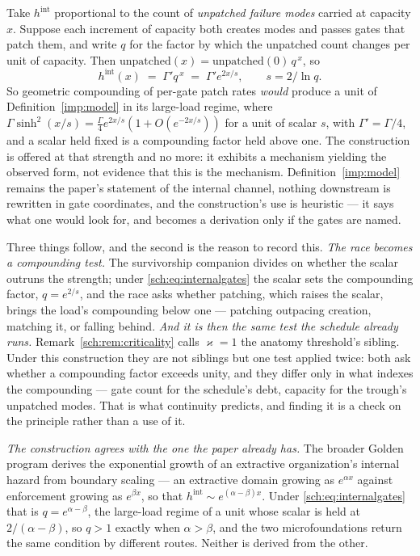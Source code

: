 \begin{remark}\label{sch:rem:internalgates}
Take $h^{\mathrm{int}}$ proportional to the count of \emph{unpatched
failure modes} carried at capacity $x$. Suppose each increment of
capacity both creates modes and passes gates that patch them, and write
$q$ for the factor by which the unpatched count changes per unit of
capacity. Then $\text{unpatched}(x)=\text{unpatched}(0)\,q^{\,x}$, so
\begin{equation}\label{sch:eq:internalgates}
h^{\mathrm{int}}(x)\;=\;\Gamma' q^{\,x}\;=\;\Gamma' e^{2x/s},
\qquad s=2/\ln q .
\end{equation}
So geometric compounding of per-gate patch rates \emph{would} produce a
unit of Definition~\ref{imp:model} in its large-load regime, where
$\Gamma\sinh^2(x/s)=\tfrac{\Gamma}{4}e^{2x/s}(1+O(e^{-2x/s}))$ for a unit of
scalar $s$, with $\Gamma'=\Gamma/4$, and a scalar held fixed is a
compounding factor held above one. The construction is offered at that
strength and no more: it exhibits a mechanism yielding the observed form,
not evidence that this is the mechanism. Definition~\ref{imp:model}
remains the paper's statement of the internal channel, nothing downstream
is rewritten in gate coordinates, and the construction's use is heuristic
--- it says what one would look for, and becomes a derivation only if the
gates are named.

Three things follow, and the second is the reason to record this. \emph{The race becomes a compounding test.}
The survivorship companion \cite{GoldenSurvivorship} divides on whether the
scalar outruns the strength; under \eqref{sch:eq:internalgates} the scalar
sets the compounding factor, $q=e^{2/s}$, and the race asks whether
patching, which raises the scalar, brings the load's compounding below
one --- patching outpacing creation, matching it, or falling behind. \emph{And it is then the same test the schedule already runs.}
Remark~\ref{sch:rem:criticality} calls $\varkappa=1$ the anatomy threshold's
sibling. Under this construction they are not siblings but one test
applied twice: both ask whether a compounding factor exceeds unity, and
they differ only in what indexes the compounding --- gate count for the
schedule's debt, capacity for the trough's unpatched modes. That is what
continuity predicts, and finding it is a check on the principle rather
than a use of it.

\emph{The construction agrees with the one the paper already has.}
The broader Golden program derives the exponential growth of an
extractive organization's internal hazard from boundary scaling --- an
extractive domain growing as $e^{\alpha x}$ against enforcement growing as
$e^{\beta x}$, so that $h^{\mathrm{int}}\sim e^{(\alpha-\beta)x}$. Under
\eqref{sch:eq:internalgates} that is $q=e^{\alpha-\beta}$, the large-load
regime of a unit whose scalar is held at $2/(\alpha-\beta)$, so $q>1$
exactly when $\alpha>\beta$, and the two microfoundations return the same
condition by different routes. Neither is derived from the other.
\end{remark}

